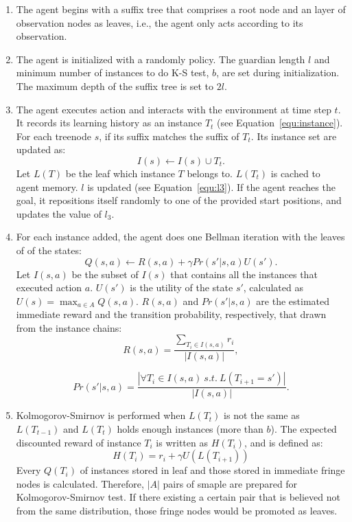 \documentclass[conference]{IEEEtran}
\begin{document}
	\begin{enumerate}
		
		\item The agent begins with a suffix tree that comprises a root node and an layer of
		observation nodes as leaves, i.e., the agent only acts according to its observation.
		
		\item The agent is initialized with a randomly policy. The guardian length $l$ and
		minimum number of instances to do K-S test, $b$, are set during initialization. The
		maximum depth of the suffix tree is set to $2l$.
		
		\item The agent executes action and interacts with the environment at time step $t$.
		It records its learning history as an instance $T_t$ (see Equation~\ref{equ:instance}).
		For each treenode $s$, if its suffix matches the suffix of $T_t$. Its instance
		set are updated as:
		\begin{equation}
		I(s) \leftarrow I(s) \cup {T_t}.
		\end{equation}
		Let $L(T)$ be the leaf which instance $T$ belongs to. $L(T_t)$ is cached to agent memory.
		$l$ is updated (see Equation~\ref{equ:l3}). If the agent reaches the goal,
		it repositions itself randomly to one of the provided start positions, and updates
		the value of $l_3$.
		
		\item For each instance added, the agent does one Bellman iteration with the leaves of
		of the states:
		\begin{equation}
		Q(s,a) \leftarrow R(s,a)  + \gamma Pr(s'|s,a)U(s').
		\end{equation}
		Let $I(s,a)$ be the subset of $I(s)$ that contains all the instances that executed
		action $a$. $U(s')$ is the utility of the state $s'$, calculated as
		$U(s) = \max_{a \in A} Q(s,a)$. $R(s,a)$ and $Pr(s'|s,a)$ are the estimated immediate
		reward and the transition probability, respectively, that drawn from the instance chains:
		\begin{equation}
		R(s,a) = \frac{\sum_{T_i \in I(s,a)}r_i} {|I(s,a)|},
		\end{equation}
		
		\begin{equation}
		Pr(s'|s,a) = \frac{|\forall{T_i \in I(s,a) \ s.t. \ L(T_{i+1} = s')}|} {|I(s,a)|}.
		\end{equation}
		
		\item Kolmogorov-Smirnov is performed when $L(T_t)$ is not the same as $L(T_{t-1})$ and
		$L(T_t)$ holds enough instances (more than $b$). The expected discounted reward of instance
		$T_i$ is written as $H(T_i)$, and is defined as:
		\begin{equation}
		H(T_i) = r_i + \gamma U(L(T_{i+1}))
		\end{equation}
		Every $Q(T_i)$ of instances stored in leaf and those stored in immediate fringe nodes is
		calculated. Therefore, $|A|$ pairs of smaple are prepared for Kolmogorov-Smirnov test. If
		there existing a certain pair that is believed not from the same distribution, those
		fringe nodes would be promoted as leaves.
		

\end{enumerate}
\end{document}
